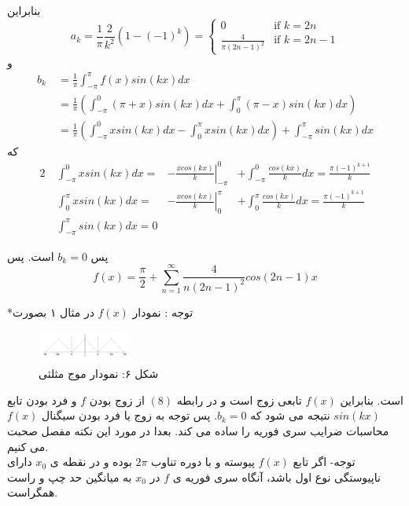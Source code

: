 \begin{example}
	بنابراین
	\[
	a_k=\frac{1}{\pi}\frac{2}{k^2}\left(1-(-1)^k\right)=
	\begin{cases}
		0 &\mbox{if } k=2n\\
		\frac{4}{\pi(2n-1)^2} &\mbox{if } k=2n-1
	\end{cases}
	\]
	و
	\begin{equation*}
		\begin{aligned}
			b_k {} &\ = \frac{1}{\pi}\int_{-\pi}^{\pi}{f(x)sin(kx)dx}\\
			&\ = \frac{1}{\pi}\left(
			\int_{-\pi}^{0}{(\pi+x)sin(kx)dx}+\int_{0}^{\pi}{(\pi-x)sin(kx)dx}
			\right)\\
			&\ = \frac{1}{\pi}\left(\int_{-\pi}^{0}{xsin(kx)dx}-\int_{0}^{\pi}{xsin(kx)dx} \right)+\int_{-\pi}^{\pi}{sin(kx)dx}
		\end{aligned}
	\end{equation*}
	که
	\begin{alignat*}{2}
		{} &\ \int_{-\pi}^{0}{xsin(kx)dx}
		=&\left.{-\frac{xcos(kx)}{k}}\right |_{-\pi}^{0} 
		&+\int_{-\pi}^{0}{\frac{cos(kx)}{k}dx}=\frac{\pi(-1)^{k+1}}{k}\\
		&\ \int_{0}^{\pi}{xsin(kx)dx}
		=&\left.{-\frac{xcos(kx)}{k}}\right |_{0}^{\pi} 
		&+\int_{0}^{\pi}{\frac{cos(kx)}{k}dx}=\frac{\pi(-1)^{k+1}}{k}\\
		&\ \int_{-\pi}^{\pi}{sin(kx)dx}=0
	\end{alignat*}
	
	پس 
	$b_k=0$
	است. پس\\
	\[f(x)=\frac{\pi}{2}+\sum_{n=1}^{\infty}{\frac{4}{n(2n-1)^2}}cos(2n-1)x\]
	
\end{example}
\hrulefill

*توجه : نمودار 
$f(x)$
در مثال ۱ بصورت 
\begin{figure}[H]
	\centering
	\includegraphics[width=0.275\textwidth]{im06.jpg}
	\caption*{شکل ۶: نمودار موج مثلثی\\
		\large{
		}
	}
\end{figure}
است. بنابراین 
$f(x)$
تابعی زوج است و در رابطه 
$(8)$
از زوج بودن 
$f$
و فرد بودن تابع
$sin(kx)$
نتیجه می شود که 
$b_k=0$.
پس توجه به زوج یا فرد بودن سیگنال 
$f(x)$
محاسبات ضرایب سری فوریه را ساده می کند. بعدا در مورد این نکته مفصل صحبت می کنیم.\\
توجه- اگر تابع 
$f(x)$
پیوسته و با دوره تناوب 
$2\pi$
بوده و در نقطه ی 
$x_0$
دارای ناپیوستگی نوع اول باشد، آنگاه سری فوریه ی
$f$
در
$x_0$
به میانگین حد چپ و راست همگراست.\\

